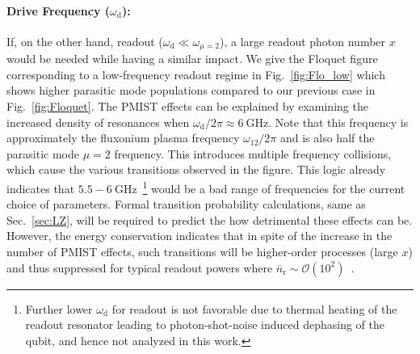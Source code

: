 \documentclass[%
reprint,
superscriptaddress,
 amsmath,amssymb,
 aps,
 prx,
longbibliography,
floatfix,
]{revtex4-2}
\begin{document}
\paragraph{Drive Frequency ($\omega_\textrm{d}$):} If, on the other hand, readout ($\omega_\textrm{d} \ll \omega_{\mu = 2}$), a large readout photon number $x$ would be needed while having a similar impact. We give the Floquet figure corresponding to a low-frequency readout regime in Fig.~\ref{fig:Flo_low} which shows higher parasitic mode populations compared to our previous case in Fig.~\ref{fig:Floquet}. The PMIST effects can be explained by examining the increased density of resonances when $\omega_\textrm{d}/2\pi \approx 6 \ \mathrm{GHz}$. Note that this frequency is approximately the fluxonium plasma frequency $\omega_{12}/2\pi$ and is also half the parasitic mode $\mu=2$ frequency. This introduces multiple frequency collisions, which cause the various transitions observed in the figure. This logic already indicates that $5.5-6 \ \mathrm{GHz}$~\footnote{Further lower $\omega_\textrm{d}$ for readout is not favorable due to thermal heating of the readout resonator leading to photon-shot-noise induced dephasing of the qubit, and hence not analyzed in this work. } would be a bad range of frequencies for the current choice of parameters. Formal transition probability calculations, same as Sec.~\ref{sec:LZ}, will be required to predict the how detrimental these effects can be. However, the energy conservation indicates that in spite of the increase in the number of PMIST effects, such transitions will be higher-order processes (large $x$) and thus suppressed for typical readout powers where $\bar n_\textrm{r}\sim \mathcal{O}(10^2)$~\cite{gusenkova2021quantum}.  
\end{document}
